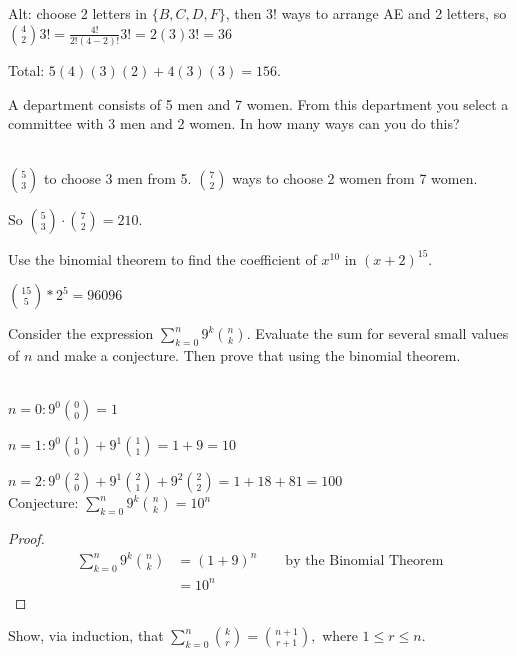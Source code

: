 \documentclass[12 pt]{exam}
\begin{document}
\begin{questions}
\begin{solution}
Alt: choose 2 letters in $\{B, C, D, F\}$, then 3! ways to arrange AE and 2 letters,
so $\binom{4}{2} 3! = \frac{4!}{2!(4-2)!} 3! = 2(3) 3! = 36$

Total: $5(4)(3)(2) + 4(3)(3) = 156$.
\end{solution}


\question  A department consists of 5 men and 7 women. From this department you select
a committee with 3 men and 2 women. In how many ways can you do this?

\begin{solution}\\
$\binom{5}{3}$ to choose 3 men from 5. $\binom{7}{2}$ ways to choose 2 women from 7 women.

So $\binom{5}{3} \cdot \binom{7}{2} = 210$.
\end{solution}



\question Use the binomial theorem to find the coefficient of $x^{10}$ in $(x+2)^{15}.$

\begin{solution}
$\binom{15}{5} * 2^5 = 96096$
\end{solution}



\question Consider the expression $\sum_{k=0}^n 9^k \binom{n}{k}$. Evaluate the sum for several small values of $n$ and make a conjecture. Then prove that using the binomial theorem.

\begin{solution}\\
$n=0: 9^0 \binom{0}{0} = 1$

$n=1: 9^0 \binom{1}{0} + 9^1 \binom{1}{1} = 1 + 9 = 10$

$n=2: 9^0 \binom{2}{0} + 9^1 \binom{2}{1} + 9^2 \binom{2}{2} = 1 + 18 + 81 = 100$\\

Conjecture: $\sum_{k=0}^n 9^k \binom{n}{k} = 10^n$

\begin{proof}
\begin{align*}
    \sum_{k=0}^n 9^k \binom{n}{k} &= (1+9)^n \qquad \text{by the Binomial Theorem}\\
    &= 10^n
\end{align*}
\end{proof}
\end{solution}



\question Show, via induction, that $\sum_{k=0}^n \binom{k}{r} = \binom{n+1}{r+1},$ where $1 \leq r \leq n$. 


\end{questions}
\end{document}
